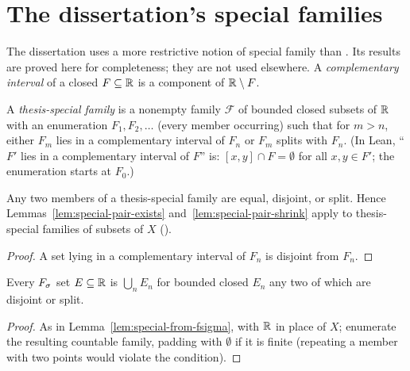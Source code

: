 \appendix
\section{The dissertation's special families}\label{app:variants}
The dissertation uses a more restrictive notion of special family than \cite{TAMSb}. Its results are proved here for completeness;
they are not used elsewhere. A \emph{complementary interval} of a closed $F\subseteq\mathbb{R}$ is a component of $\mathbb{R}\setminus F$.

\begin{definition}\label{def:th-special}
A \emph{thesis-special family} is a nonempty family $\mathcal F$ of bounded closed subsets of $\mathbb{R}$ with an enumeration $F_1,F_2,\dots$ (every
member occurring) such that for $m>n$, either $F_m$ lies in a complementary interval of $F_n$ or $F_m$ splits with $F_n$.
(In Lean, ``$F'$ lies in a complementary interval of $F$'' is: $[x,y]\cap F=\emptyset$ for all $x,y\in F'$; the enumeration starts at $F_0$.)
\end{definition}

\begin{lemma}\label{lem:th-special-implies}
Any two members of a thesis-special family are equal, disjoint, or split. Hence Lemmas~\ref{lem:special-pair-exists}
and~\ref{lem:special-pair-shrink} apply to thesis-special families of subsets of $X$ (\cite[Lemmas 13, 14]{Diss}).
\end{lemma}
\begin{proof}
A set lying in a complementary interval of $F_n$ is disjoint from $F_n$.
\end{proof}

\begin{lemma}\label{lem:th-lemma9}
Every $F_\sigma$ set $E\subseteq\mathbb{R}$ is $\bigcup_nE_n$ for bounded closed $E_n$ any two of which are disjoint or split.
\end{lemma}
\begin{proof}
As in Lemma~\ref{lem:special-from-fsigma}, with $\mathbb{R}$ in place of $X$; enumerate the resulting countable family, padding
with $\emptyset$ if it is finite (repeating a member with two points would violate the condition).
\end{proof}

